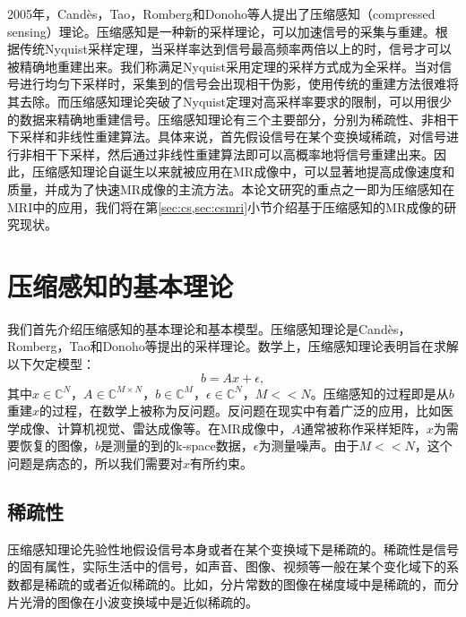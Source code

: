 2005年，Candès，Tao，Romberg\cite{candes2004near,candes2006compressive,candes2006quantitative,candes2006stable}和Donoho\cite{Donoho2006Compressed}等人提出了压缩感知（compressed sensing）理论。压缩感知是一种新的采样理论，可以加速信号的采集与重建。根据传统Nyquist采样定理\cite{Nyquist}，当采样率达到信号最高频率两倍以上的时，信号才可以被精确地重建出来。我们称满足Nyquist采用定理的采样方式成为全采样。当对信号进行均匀下采样时，采集到的信号会出现相干伪影，使用传统的重建方法很难将其去除。而压缩感知理论突破了Nyquist定理对高采样率要求的限制，可以用很少的数据来精确地重建信号。压缩感知理论有三个主要部分，分别为稀疏性、非相干下采样和非线性重建算法。具体来说，首先假设信号在某个变换域稀疏，对信号进行非相干下采样，然后通过非线性重建算法即可以高概率地将信号重建出来。因此，压缩感知理论自诞生以来就被应用在MR成像中，可以显著地提高成像速度和质量，并成为了快速MR成像的主流方法。本论文研究的重点之一即为压缩感知在MRI中的应用，我们将在第\ref{sec:cs,sec:csmri}小节介绍基于压缩感知的MR成像的研究现状。

\section{压缩感知的基本理论}
\label{sec:cs}
我们首先介绍压缩感知的基本理论和基本模型。压缩感知理论是Candès，Romberg，Tao\cite{candes2004near,candes2006compressive,candes2006quantitative,candes2006stable}和Donoho\cite{Donoho2006Compressed}等提出的采样理论。数学上，压缩感知理论表明旨在求解以下欠定模型：
\begin{equation}
	b=Ax+\epsilon,
	\label{equ:cs}
\end{equation}
其中$x\in \mathbb{C}^N$，$A\in \mathbb{C}^{M\times N}$，$b\in \mathbb{C}^M$，$\epsilon\in \mathbb{C}^N$，$M<<N$。压缩感知的过程即是从$b$重建$x$的过程，在数学上被称为反问题。反问题在现实中有着广泛的应用，比如医学成像\cite{golbabaee2012hyperspectral,quinsac2010compressed,xu2012low,lustig2006}、计算机视觉\cite{wright2008robust}、雷达成像\cite{choi2010compressed}等。在MR成像中，$A$通常被称作采样矩阵，$x$为需要恢复的图像，$b$是测量的到的k-space数据，$\epsilon$为测量噪声。由于$M<<N$，这个问题是病态的，所以我们需要对$x$有所约束。

\subsection{稀疏性}
压缩感知理论先验性地假设信号本身或者在某个变换域下是稀疏的。稀疏性是信号的固有属性，实际生活中的信号，如声音、图像、视频等一般在某个变化域下的系数都是稀疏的或者近似稀疏的。比如，分片常数的图像在梯度域中是稀疏的，而分片光滑的图像在小波变换域中是近似稀疏的。

